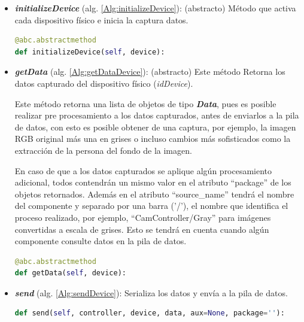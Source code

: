 \begin{itemize}
            \item \textbf{\textit{initializeDevice}} (alg. \ref{Alg:initializeDevice}):
            (abstracto) Método que activa cada dispositivo físico e inicia la captura datos. 
            
            \begin{lstlisting}[language=Python, caption={Firma del método ``\textit{initializeDevice}''.}, label=Alg:initializeDevice, numbers=none]
@abc.abstractmethod
def initializeDevice(self, device):
            \end{lstlisting}
            
            \item \textbf{\textit{getData}} (alg. \ref{Alg:getDataDevice}):
            (abstracto) Este método Retorna los datos capturado del dispositivo físico (\textit{idDevice}).
            
            Este método retorna una lista de objetos de tipo \textbf{\textit{Data}}, pues es posible realizar pre procesamiento a los datos capturados, antes de enviarlos a la pila de datos, con esto es posible obtener de una captura, por ejemplo, la imagen RGB original más una en grises o incluso cambios más sofisticados como la extracción de la persona del fondo de la imagen.
            
            En caso de que a los datos capturados se aplique algún procesamiento adicional, todos contendrán un mismo valor en el atributo ``package'' de los objetos retornados. Además en el atributo ``source\_name'' tendrá el nombre del componente y separado por una barra ('/'), el nombre que identifica el proceso realizado, por ejemplo, ``CamController/Gray'' para imágenes convertidas a escala de grises. Esto se tendrá en cuenta cuando algún componente consulte datos en la pila de datos.
            
            \begin{lstlisting}[language=Python, caption={Firma del método ``\textit{getData}''.}, label=Alg:getDataDevice, numbers=none]
@abc.abstractmethod
def getData(self, device):
            \end{lstlisting}
            
            \item \textbf{\textit{send}} (alg. \ref{Alg:sendDevice}): 
            Serializa los datos y envía a la pila de datos.
            
            \begin{lstlisting}[language=Python, caption={Firma del método ``\textit{send}''.}, label=Alg:sendDevice, numbers=none]
def send(self, controller, device, data, aux=None, package=''):
            \end{lstlisting}
            

\end{itemize}
